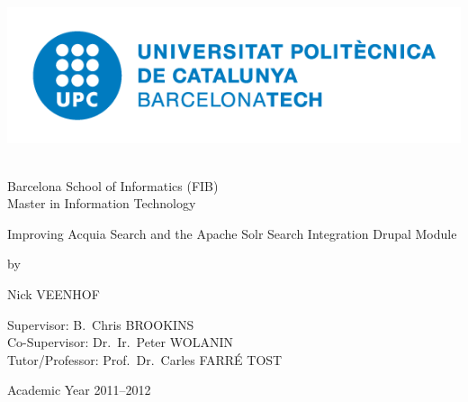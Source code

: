 

\begin{titlepage}

\setlength{\hoffset}{-1in}
\setlength{\voffset}{-1in}
\setlength{\topmargin}{1.5cm}
\setlength{\headheight}{0.5cm}
\setlength{\headsep}{1cm}
\setlength{\oddsidemargin}{3cm}
\setlength{\evensidemargin}{3cm}
\setlength{\footskip}{1.5cm}
\enlargethispage{1cm}


\fontsize{12pt}{14pt}
\selectfont

\begin{center}

\includegraphics[height=5cm]{images/logoUPCblau-complet}

\vspace{0.5cm}

Barcelona School of Informatics (FIB)\\
Master in Information Technology\\

\vspace{3.5cm}

\fontsize{17.28pt}{21pt}
\selectfont

Improving Acquia Search and the Apache Solr Search Integration Drupal Module\\

\fontsize{12pt}{14pt}
\selectfont

\vspace{.6cm}

by 

\vspace{.4cm}

Nick VEENHOF

\vspace{3.5cm}

Supervisor: B.~Chris BROOKINS\\
Co-Supervisor: Dr.~Ir.~Peter WOLANIN\\
Tutor/Professor: Prof.~Dr.~Carles FARR\'{E} TOST\\

\vspace{2cm}

Academic Year 2011--2012

\end{center}
\end{titlepage}
